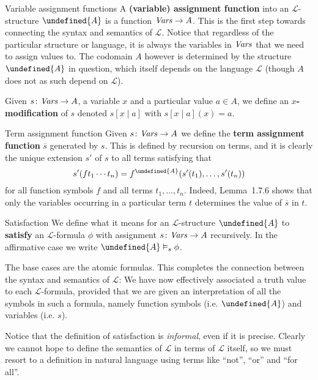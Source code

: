 \documentclass[article, a4paper, 11pt, oneside]{memoir}
\let\mathfrak\undefined
\numberwithin{equation}{chapter}
\newcommand{\calL}{\mathcal{L}}
\newcommand{\frakA}{\mathfrak{A}}
\newcommand{\keyword}[1]{{\bfseries #1}}
\theoremstyle{nonumberplain}
\begin{document}
\begin{notelist}
    \item[Variable assignment functions]
    A \keyword{(variable) assignment function} into an $\calL$-structure $\frakA$ is a function $\mathit{Vars} \to A$. This is the first step towards connecting the syntax and semantics of $\calL$. Notice that regardless of the particular structure or language, it is always the variables in $\mathit{Vars}$ that we need to assign values to. The codomain $A$ however is determined by the structure $\frakA$ in question, which itself depends on the language $\calL$ (though $A$ does not as such depend on $\calL$).

    Given $s \colon \mathit{Vars} \to A$, a variable $x$ and a particular value $a \in A$, we define an \keyword{$x$-modification} of $s$ denoted $s[x \mid a]$ with $s[x \mid a](x) = a$.

    \item[Term assignment function]
    Given $s \colon \mathit{Vars} \to A$ we define the \keyword{term assignment function} $\overline{s}$ generated by $s$. This is defined by recursion on terms, and it is clearly the unique extension $s'$ of $s$ to all terms satisfying that
    \begin{equation*}
        s'(f t_1 \cdots t_n)
            = f^\frakA (s'(t_1), \ldots, s'(t_n))
    \end{equation*}
    for all function symbols $f$ and all terms $t_1, \ldots, t_n$. Indeed, Lemma~1.7.6 shows that only the variables occurring in a particular term $t$ determines the value of $\overline{s}$ in $t$.

    \item[Satisfaction]
    We define what it means for an $\calL$-structure $\frakA$ to \keyword{satisfy} an $\calL$-formula $\phi$ with assignment $s \colon \mathit{Vars} \to A$ recursively. In the affirmative case we write $\frakA \sats{s} \phi$.
    
    The base cases are the atomic formulas. This completes the connection between the syntax and semantics of $\calL$: We have now effectively associated a truth value to each $\calL$-formula, provided that we are given an interpretation of all the symbols in such a formula, namely function symbols (i.e. $\frakA$) and variables (i.e. $s$).

    Notice that the definition of satisfaction is \emph{informal}, even if it is precise. Clearly we cannot hope to define the semantics of $\calL$ in terms of $\calL$ itself, so we must resort to a definition in natural language using terms like \enquote{not}, \enquote{or} and \enquote{for all}.


\end{notelist}
\end{document}
